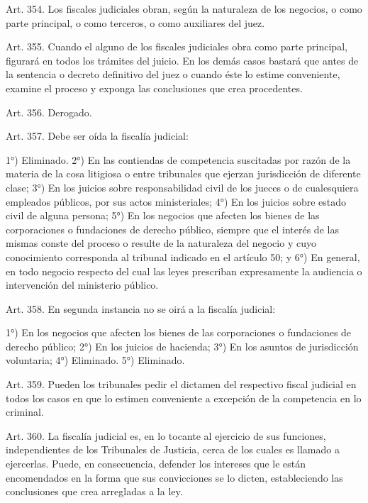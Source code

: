     Art. 354. Los fiscales judiciales obran, según la naturaleza de los negocios, o como parte principal, o como terceros, o como auxiliares del juez.



    Art. 355. Cuando el alguno de los fiscales judiciales obra como parte principal, figurará en todos los trámites del juicio.
    En los demás casos bastará que antes de la sentencia o decreto definitivo del juez o cuando éste lo estime conveniente, examine el proceso y exponga las conclusiones que crea procedentes.

    Art. 356. Derogado.




    Art. 357. Debe ser oída la fiscalía judicial:

    1°) Eliminado.
    2°) En las contiendas de competencia suscitadas por razón de la materia de la cosa litigiosa o entre tribunales que ejerzan jurisdicción de diferente clase;
    3°) En los juicios sobre responsabilidad civil de los jueces o de cualesquiera empleados públicos, por sus actos ministeriales;
    4°) En los juicios sobre estado civil de alguna persona;
    5°) En los negocios que afecten los bienes de las corporaciones o fundaciones de derecho público, siempre que el interés de las mismas conste del proceso o resulte de la naturaleza del negocio y cuyo conocimiento corresponda al tribunal indicado en el artículo 50; y
    6°) En general, en todo negocio respecto del cual las leyes prescriban expresamente la audiencia o intervención del ministerio público.


    Art. 358. En segunda instancia no se oirá a la fiscalía judicial:

    1°) En los negocios que afecten los bienes de las corporaciones o fundaciones de derecho público;
    2°) En los juicios de hacienda;
    3°) En los asuntos de jurisdicción voluntaria;
    4°) Eliminado.
    5°) Eliminado.


    Art. 359. Pueden los tribunales pedir el dictamen del respectivo fiscal judicial en todos los casos en que lo estimen conveniente a excepción de la competencia en lo criminal.



    Art. 360. La fiscalía judicial es, en lo tocante al ejercicio de sus funciones, independientes de los Tribunales de Justicia, cerca de los cuales es llamado a ejercerlas.
    Puede, en consecuencia, defender los intereses que le están encomendados en la forma que sus convicciones se lo dicten, estableciendo las conclusiones que crea arregladas a la ley.



